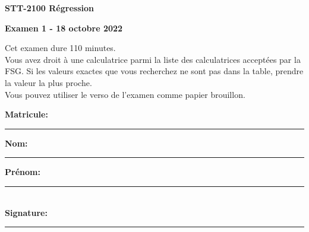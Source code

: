 \documentclass[a4paper, 11pt]{article}
\begin{document}
\begin{center}
{\bf STT-2100 Régression }\\
\end{center}
\begin{center}
{\bf Examen 1 - 18 octobre 2022 }\\
\end{center}


\vspace{0.2 in}
Cet examen dure 110 minutes. \\

Vous avez droit à une calculatrice parmi la liste des calculatrices acceptées par la FSG. Si les valeurs exactes que vous recherchez ne sont pas dans la table, prendre la valeur la plus proche.\\

Vous pouvez utiliser le verso de l'examen comme papier brouillon.

\vspace{0.4 in}

{\bf Matricule:} \quad\rule{2in}{.01in}

\vspace{.5in}

{\bf Nom:}\quad\rule{2in}{.01in}{\bf Prénom:}\quad\rule{2in}{.01in}\\


{\bf Signature:}\quad\rule{3in}{.01in}\\
\end{document}
